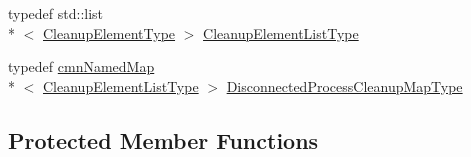\begin{DoxyCompactItemize}
\item 
typedef std\-::list\\*
$<$ \hyperlink{structmts_manager_global_1_1_cleanup_element_type}{Cleanup\-Element\-Type} $>$ \hyperlink{classmts_manager_global_a2e81b6e4dd89cef56e621cac95944bfd}{Cleanup\-Element\-List\-Type}
\item 
typedef \hyperlink{classcmn_named_map}{cmn\-Named\-Map}\\*
$<$ \hyperlink{classmts_manager_global_a2e81b6e4dd89cef56e621cac95944bfd}{Cleanup\-Element\-List\-Type} $>$ \hyperlink{classmts_manager_global_a9df2055466c1e6a041ae3abc266fe507}{Disconnected\-Process\-Cleanup\-Map\-Type}
\end{DoxyCompactItemize}
\subsection*{Protected Member Functions}
